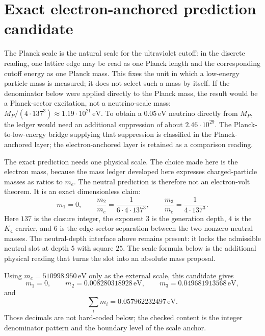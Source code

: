 \documentclass[11pt]{article}
\begin{document}
\section{Exact electron-anchored prediction candidate}

The Planck scale is the natural scale for the ultraviolet cutoff: in the
discrete reading, one lattice edge may be read as one Planck length and
the corresponding cutoff energy as one Planck mass.  This fixes the unit
in which a low-energy particle mass is measured; it does not select such
a mass by itself.  If the denominator below were applied directly to the
Planck mass, the result would be a Planck-sector
excitation, not a neutrino-scale mass: $M_P/(4\cdot137^3) \approx
1.19\cdot10^{21}\,\mathrm{eV}$.  To obtain a $0.05\,\mathrm{eV}$
neutrino directly from $M_P$, the ledger would need an additional
suppression of about $2.46\cdot10^{29}$.  The Planck-to-low-energy
bridge supplying that suppression is classified in the Planck-anchored
layer; the electron-anchored layer is retained as a comparison reading.

The exact prediction needs one physical scale.  The choice made here is
the electron mass, because the mass ledger developed here expresses
charged-particle masses as ratios to $m_e$.  The neutral prediction is
therefore not an electron-volt theorem.  It is an exact dimensionless
claim:
\[
  m_1 = 0, \qquad
  \frac{m_2}{m_e} = \frac{1}{6\cdot 4\cdot 137^3}, \qquad
  \frac{m_3}{m_e} = \frac{1}{4\cdot 137^3}.
\]
Here $137$ is the closure integer, the exponent $3$ is the generation
depth, $4$ is the $K_4$ carrier, and $6$ is the edge-sector separation
between the two nonzero neutral masses.  The neutral-depth interface
above remains present: it locks the admissible neutral slot at depth $5$
with square $25$.  The scale formula below is the additional physical
reading that turns the slot into an absolute mass proposal.

Using $m_e = 510998.950\,\mathrm{eV}$ only as the external scale, this
candidate gives
\[
  m_1 = 0, \qquad
  m_2 = 0.008280318928\,\mathrm{eV}, \qquad
  m_3 = 0.049681913568\,\mathrm{eV},
\]
and
\[
  \sum_i m_i = 0.057962232497\,\mathrm{eV}.
\]
Those decimals are not hard-coded below; the checked content is the
integer denominator pattern and the boundary level of the scale anchor.
\end{document}
